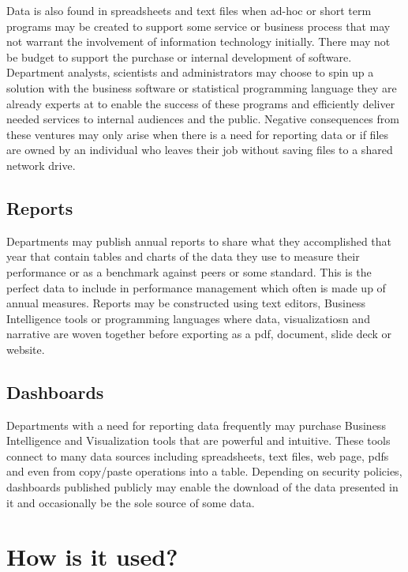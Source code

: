 \documentclass[
  openany]{book}
\begin{document}
Data is also found in spreadsheets and text files when ad-hoc or short term programs may be created to support some service or business process that may not warrant the involvement of information technology initially. There may not be budget to support the purchase or internal development of software. Department analysts, scientists and administrators may choose to spin up a solution with the business software or statistical programming language they are already experts at to enable the success of these programs and efficiently deliver needed services to internal audiences and the public. Negative consequences from these ventures may only arise when there is a need for reporting data or if files are owned by an individual who leaves their job without saving files to a shared network drive.

\hypertarget{reports}{%
\subsection{Reports}\label{reports}}

Departments may publish annual reports to share what they accomplished that year that contain tables and charts of the data they use to measure their performance or as a benchmark against peers or some standard. This is the perfect data to include in performance management which often is made up of annual measures. Reports may be constructed using text editors, Business Intelligence tools or programming languages where data, visualizatiosn and narrative are woven together before exporting as a pdf, document, slide deck or website.

\hypertarget{dashboards}{%
\subsection{Dashboards}\label{dashboards}}

Departments with a need for reporting data frequently may purchase Business Intelligence and Visualization tools that are powerful and intuitive. These tools connect to many data sources including spreadsheets, text files, web page, pdfs and even from copy/paste operations into a table. Depending on security policies, dashboards published publicly may enable the download of the data presented in it and occasionally be the sole source of some data.

\hypertarget{how-is-it-used}{%
\section{How is it used?}\label{how-is-it-used}}
\end{document}
